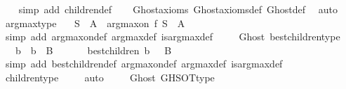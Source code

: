 \begin{isabellebody}
%
\isadelimproof
\ \ %
\endisadelimproof
%
\isatagproof
{}\isamarkupfalse%
\ {\isacharparenleft}simp\ add{\isacharcolon}\ children{\isacharunderscore}def{\isacharparenright}\isanewline
\ \ \isamarkupfalse%
\ Ghost{\isacharunderscore}axioms\ Ghost{\isacharunderscore}axioms{\isacharunderscore}def\ Ghost{\isacharunderscore}def\ \isamarkupfalse%
\ auto%
\endisatagproof
{\isafoldproof}%
%
\isadelimproof
\isanewline
%
\endisadelimproof
\isanewline
{}\isamarkupfalse%
\ argmax{\isacharunderscore}type\ {\isacharcolon}\isanewline
\ \ {\isachardoublequoteopen}S\ {\isasymsubseteq}\ A\ {\isasymLongrightarrow}\ arg{\isacharunderscore}max{\isacharunderscore}on\ f\ S\ {\isasymin}\ A{\isachardoublequoteclose}\ \isanewline
%
\isadelimproof
\ \ %
\endisadelimproof
%
\isatagproof
{}\isamarkupfalse%
\ {\isacharparenleft}simp\ add{\isacharcolon}\ arg{\isacharunderscore}max{\isacharunderscore}on{\isacharunderscore}def\ arg{\isacharunderscore}max{\isacharunderscore}def\ is{\isacharunderscore}arg{\isacharunderscore}max{\isacharunderscore}def{\isacharparenright}\isanewline
\ \ \isamarkupfalse%
%
\endisatagproof
{\isafoldproof}%
%
\isadelimproof
\isanewline
%
\endisadelimproof
\isanewline
{}\isamarkupfalse%
\ {\isacharparenleft}\ Ghost{\isacharparenright}\ best{\isacharunderscore}children{\isacharunderscore}type\ {\isacharcolon}\isanewline
\ \ {\isachardoublequoteopen}{\isasymforall}\ b\ {\isasymsigma}{\isachardot}\ b\ {\isasymin}\ B\ {\isasymand}\ {\isasymsigma}\ {\isasymin}\ {\isasymSigma}\ {\isasymlongrightarrow}\ \ best{\isacharunderscore}children\ {\isacharparenleft}b{\isacharcomma}\ {\isasymsigma}{\isacharparenright}\ {\isasymsubseteq}\ B{\isachardoublequoteclose}\isanewline
%
\isadelimproof
\ \ %
\endisadelimproof
%
\isatagproof
{}\isamarkupfalse%
\ {\isacharparenleft}simp\ add{\isacharcolon}\ best{\isacharunderscore}children{\isacharunderscore}def\ arg{\isacharunderscore}max{\isacharunderscore}on{\isacharunderscore}def\ arg{\isacharunderscore}max{\isacharunderscore}def\ is{\isacharunderscore}arg{\isacharunderscore}max{\isacharunderscore}def{\isacharparenright}\isanewline
\ \ \isamarkupfalse%
\ children{\isacharunderscore}type\ \isanewline
\ \ \isamarkupfalse%
\ auto\isanewline
\ \ \isamarkupfalse%
%
\endisatagproof
{\isafoldproof}%
%
\isadelimproof
\isanewline
%
\endisadelimproof
\isanewline
{}\isamarkupfalse%
\ {\isacharparenleft}\ Ghost{\isacharparenright}\ GHSOT{\isacharunderscore}type\ {\isacharcolon}\isanewline

\end{isabellebody}
